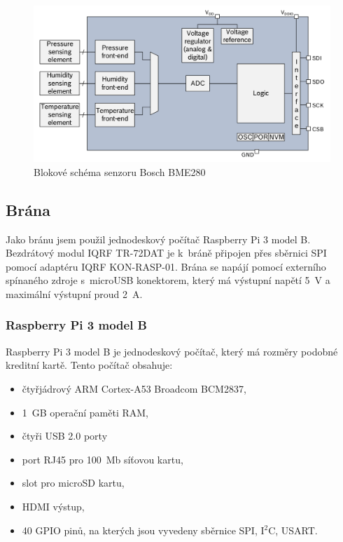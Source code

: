 \documentclass[12pt,a4paper]{article}
\begin{document}
\begin{figure}[H]
\centering
\label{fig:bme280-block-diagram}
\includegraphics[width = 128mm]{../img/bme280-block-diagram.png}
\caption{Blokové schéma senzoru Bosch BME280}
\end{figure}

\newpage

\subsection{Brána}

Jako bránu jsem použil jednodeskový počítač Raspberry Pi 3 model B. Bezdrátový modul IQRF TR-72DAT je k~bráně připojen přes sběrnici SPI pomocí adaptéru IQRF KON-RASP-01. Brána se napájí pomocí externího spínaného zdroje s~microUSB konektorem, který má výstupní napětí 5~V a maximální výstupní proud 2~A.

\subsubsection{Raspberry Pi 3 model B}

Raspberry Pi 3 model B je jednodeskový počítač, který má rozměry podobné kreditní kartě. Tento počítač obsahuje:

\begin{itemize}
  \item čtyřjádrový ARM Cortex-A53 Broadcom BCM2837,
  \item 1~GB operační paměti RAM,
  \item čtyři USB 2.0 porty
  \item port RJ45 pro 100~Mb síťovou kartu,
  \item slot pro microSD kartu,
  \item HDMI výstup,
  \item 40 GPIO pinů, na kterých jsou vyvedeny sběrnice SPI, I$^{2}$C, USART.
\end{itemize}
\end{document}
